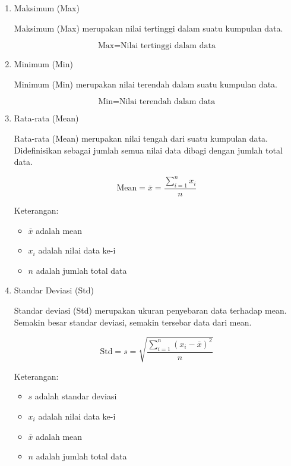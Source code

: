 \begin{enumerate}
\item Maksimum (Max)

Maksimum (Max) merupakan nilai tertinggi dalam suatu kumpulan data. 

\begin{equation}
\text{Max} = \text{Nilai tertinggi dalam data}
\end{equation}

\item Minimum (Min)

Minimum (Min) merupakan nilai terendah dalam suatu kumpulan data. 

\begin{equation}
\text{Min} = \text{Nilai terendah dalam data}
\end{equation}

\item Rata-rata (Mean)

Rata-rata (Mean) merupakan nilai tengah dari suatu kumpulan data. Didefinisikan sebagai jumlah semua nilai data dibagi dengan jumlah total data.

\begin{equation}
\text{Mean} = \bar{x} = \frac{\sum_{i=1}^{n} x_i}{n}
\end{equation}

Keterangan:
\begin{itemize}
\item $\bar{x}$ adalah mean
\item $x_i$ adalah nilai data ke-i
\item $n$ adalah jumlah total data
\end{itemize}

\item Standar Deviasi (Std)

Standar deviasi (Std) merupakan ukuran penyebaran data terhadap mean. Semakin besar standar deviasi, semakin tersebar data dari mean. 

\begin{equation}
\text{Std} = s = \sqrt{\frac{\sum_{i=1}^{n} (x_i - \bar{x})^2}{n}}
\end{equation}

Keterangan:
\begin{itemize}
\item $s$ adalah standar deviasi
\item $x_i$ adalah nilai data ke-i
\item $\bar{x}$ adalah mean
\item $n$ adalah jumlah total data
\end{itemize}

\end{enumerate}

